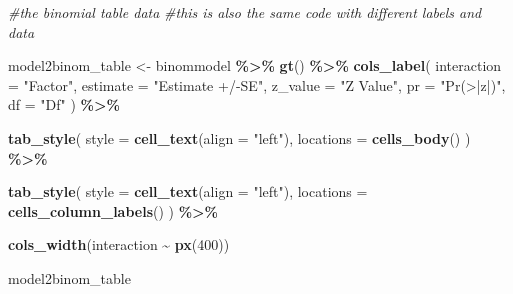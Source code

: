 \documentclass[
]{article}
\newenvironment{Shaded}{\begin{snugshade}}{\end{snugshade}}
\newcommand{\AttributeTok}[1]{\textcolor[rgb]{0.13,0.29,0.53}{#1}}
\newcommand{\CommentTok}[1]{\textcolor[rgb]{0.56,0.35,0.01}{\textit{#1}}}
\newcommand{\DecValTok}[1]{\textcolor[rgb]{0.00,0.00,0.81}{#1}}
\newcommand{\FunctionTok}[1]{\textcolor[rgb]{0.13,0.29,0.53}{\textbf{#1}}}
\newcommand{\NormalTok}[1]{#1}
\newcommand{\OtherTok}[1]{\textcolor[rgb]{0.56,0.35,0.01}{#1}}
\newcommand{\SpecialCharTok}[1]{\textcolor[rgb]{0.81,0.36,0.00}{\textbf{#1}}}
\newcommand{\StringTok}[1]{\textcolor[rgb]{0.31,0.60,0.02}{#1}}
\begin{document}
\begin{Shaded}
\begin{Highlighting}[]
\CommentTok{\#the binomial table data }
\CommentTok{\#this is also the same code with different labels and data}

\NormalTok{model2binom\_table }\OtherTok{\textless{}{-}}\NormalTok{ binommodel }\SpecialCharTok{\%\textgreater{}\%}
  \FunctionTok{gt}\NormalTok{() }\SpecialCharTok{\%\textgreater{}\%}
  \FunctionTok{cols\_label}\NormalTok{(}
    \AttributeTok{interaction =} \StringTok{"Factor"}\NormalTok{,  }
    \AttributeTok{estimate =} \StringTok{"Estimate +/{-}SE"}\NormalTok{,          }
    \AttributeTok{z\_value =} \StringTok{"Z Value"}\NormalTok{,}
    \AttributeTok{pr =} \StringTok{"Pr(\textgreater{}|z|)"}\NormalTok{,}
    \AttributeTok{df =} \StringTok{"Df"}
\NormalTok{  ) }\SpecialCharTok{\%\textgreater{}\%}

  \FunctionTok{tab\_style}\NormalTok{(}
    \AttributeTok{style =} \FunctionTok{cell\_text}\NormalTok{(}\AttributeTok{align =} \StringTok{"left"}\NormalTok{),}
    \AttributeTok{locations =} \FunctionTok{cells\_body}\NormalTok{()}
\NormalTok{  ) }\SpecialCharTok{\%\textgreater{}\%}

  \FunctionTok{tab\_style}\NormalTok{(}
    \AttributeTok{style =} \FunctionTok{cell\_text}\NormalTok{(}\AttributeTok{align =} \StringTok{"left"}\NormalTok{),}
    \AttributeTok{locations =} \FunctionTok{cells\_column\_labels}\NormalTok{()}
\NormalTok{  ) }\SpecialCharTok{\%\textgreater{}\%}
  
  \FunctionTok{cols\_width}\NormalTok{(interaction }\SpecialCharTok{\textasciitilde{}} \FunctionTok{px}\NormalTok{(}\DecValTok{400}\NormalTok{))}

\NormalTok{model2binom\_table}
\end{Highlighting}
\end{Shaded}
\end{document}
